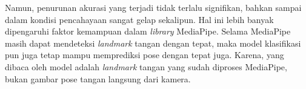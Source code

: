 Namun, penurunan akurasi yang terjadi tidak terlalu signifikan, bahkan sampai dalam kondisi pencahayaan sangat gelap sekalipun. Hal ini lebih banyak dipengaruhi faktor kemampuan dalam \emph{library} MediaPipe. Selama MediaPipe masih dapat mendeteksi \emph{landmark} tangan dengan tepat, maka model klasifikasi pun juga tetap mampu memprediksi pose dengan tepat juga. Karena, yang dibaca oleh model adalah \emph{landmark} tangan yang sudah diproses MediaPipe, bukan gambar pose tangan langsung dari kamera. 





